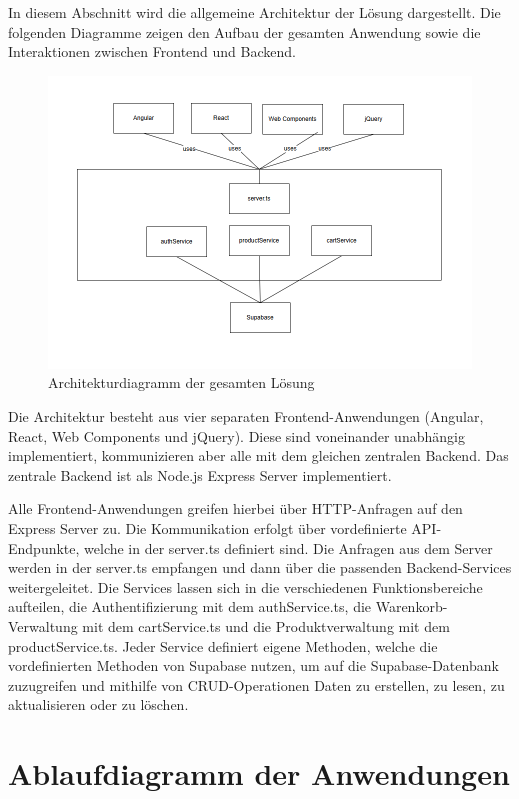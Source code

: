 \documentclass[oneside]{ausarbeitung}
\begin{document}
In diesem Abschnitt wird die allgemeine Architektur der Lösung dargestellt. Die folgenden Diagramme zeigen den Aufbau der gesamten Anwendung sowie die Interaktionen zwischen Frontend und Backend.

\begin{figure}[H]
    \centering
    \includegraphics[width=\textwidth]{images/architekturdiagramm}
    \caption{Architekturdiagramm der gesamten Lösung}
    \label{fig:architekturdiagramm}
\end{figure}

Die Architektur besteht aus vier separaten Frontend-Anwendungen (Angular, React, Web Components und jQuery). Diese sind voneinander unabhängig implementiert, kommunizieren aber alle mit dem gleichen zentralen Backend. Das zentrale Backend ist als Node.js Express Server implementiert.

Alle Frontend-Anwendungen greifen hierbei über \ac{HTTP}-Anfragen auf den Express Server zu. Die Kommunikation erfolgt über vordefinierte API-Endpunkte, welche in der server.ts definiert sind. Die Anfragen aus dem Server werden in der server.ts empfangen und dann über die passenden Backend-Services weitergeleitet. Die Services lassen sich in die verschiedenen Funktionsbereiche aufteilen, die Authentifizierung mit dem authService.ts, die Warenkorb-Verwaltung mit dem cartService.ts und die Produktverwaltung mit dem productService.ts. Jeder Service definiert eigene Methoden, welche die vordefinierten Methoden von Supabase nutzen, um auf die Supabase-Datenbank zuzugreifen und mithilfe von \ac{CRUD}-Operationen Daten zu erstellen, zu lesen, zu aktualisieren oder zu löschen.

\section{Ablaufdiagramm der Anwendungen}
\label{sec:ablauf}
\end{document}
